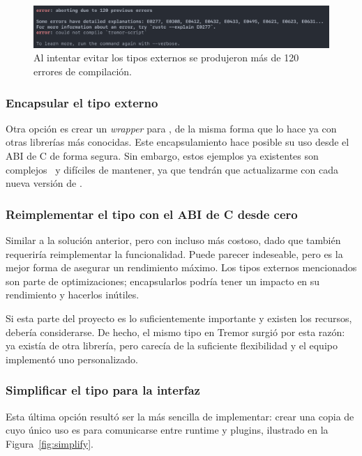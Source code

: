 \begin{figure}
    \centering
    \includegraphics[width=\textwidth]{./Imagenes/errors.png}
    \caption{Al intentar evitar los tipos externos se produjeron más de 120
    errores de compilación.}%
    \label{fig:errors}
\end{figure}

\subsubsection{Encapsular el tipo externo}

Otra opción es crear un \emph{wrapper} para , de la misma forma
que lo hace ya \abistable con otras librerías más conocidas. Este
encapsulamiento hace posible su uso desde el ABI de C de forma segura. Sin
embargo, estos ejemplos ya existentes son complejos~\cite{complexwrapper} y
difíciles de mantener, ya que tendrán que actualizarme con cada nueva versión de
.

\subsubsection{Reimplementar el tipo con el ABI de C desde cero}

Similar a la solución anterior, pero con incluso más costoso, dado que también
requeriría reimplementar la funcionalidad. Puede parecer indeseable, pero es la
mejor forma de asegurar un rendimiento máximo. Los tipos externos mencionados
son parte de optimizaciones; encapsularlos podría tener un impacto en su
rendimiento y hacerlos inútiles.

Si esta parte del proyecto es lo suficientemente importante y existen los
recursos, debería considerarse. De hecho, el mismo tipo  en Tremor
surgió por esta razón: ya existía  de otra librería, pero
carecía de la suficiente flexibilidad y el equipo implementó uno personalizado.

\subsubsection{Simplificar el tipo para la interfaz}

Esta última opción resultó ser la más sencilla de implementar: crear una copia
de  cuyo único uso es para comunicarse entre runtime y plugins,
ilustrado en la Figura~\ref{fig:simplify}.

